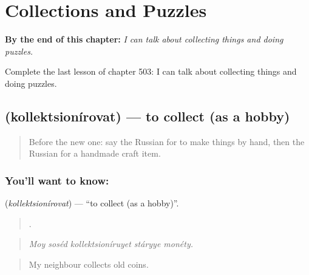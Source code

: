 
\chapter{Collections and Puzzles}
\label{ch:ru-collections-and-puzzles}

\begin{chapteropening}
\textbf{By the end of this chapter:} \emph{I can talk about collecting things and doing puzzles.}

Complete the last lesson of chapter 503: I can talk about collecting things and doing puzzles.
\end{chapteropening}

\section[\texorpdfstring{\ru{коллекционировать} (kollektsionírovat)}{коллекционировать (kollektsionírovat)}]{ (kollektsionírovat) — to collect (as a hobby)}

\label{lesson:RU-C503-kollektsionirovat}



\begin{quote}
Before the new one: say the Russian for to make things by hand, then the Russian for a handmade craft item.
\end{quote}

\subsection*{You'll want to know: }
\textbf{} (\emph{kollektsionírovat}) — \textquotedblleft{}to collect (as a hobby)\textquotedblright{}.

\begin{quote}
    .
\end{quote}

\begin{quote}
\emph{Moy soséd kollektsioníruyet stáryye monéty.}
\end{quote}

\begin{quote}
My neighbour collects old coins.
\end{quote}

